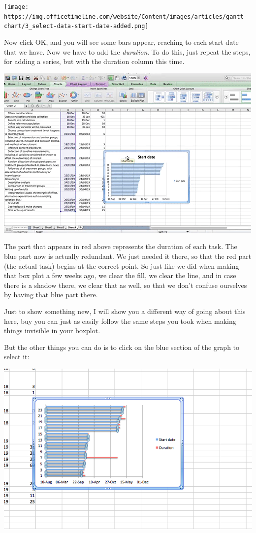 \documentclass[]{book}
\theoremstyle{definition}
\theoremstyle{definition}
\theoremstyle{definition}
\theoremstyle{remark}
\begin{document}
\texttt{[image: https://img.officetimeline.com/website/Content/images/articles/gantt-chart/3\_select-data-start-date-added.png]}

Now click OK, and you will see some bars appear, reaching to each start
date that we have. Now we have to add the \emph{duration}. To do this,
just repeat the steps, for adding a series, but with the duration column
this time.

\includegraphics{imgs/gantt_select_data_2.gif}

The part that appears in red above represents the duration of each task.
The blue part now is actually redundant. We just needed it there, so
that the red part (the actual task) begins at the correct point. So just
like we did when making that box plot a few weeks ago, we clear the
fill, we clear the line, and in case there is a shadow there, we clear
that as well, so that we don't confuse ourselves by having that blue
part there.

Just to show something new, I will show you a different way of going
about this here, buy you can just as easily follow the same steps you
took when making things invisible in your boxplot.

But the other things you can do is to click on the blue section of the
graph to select it:

\includegraphics{imgs/gantt_select_blue.png}
\end{document}

